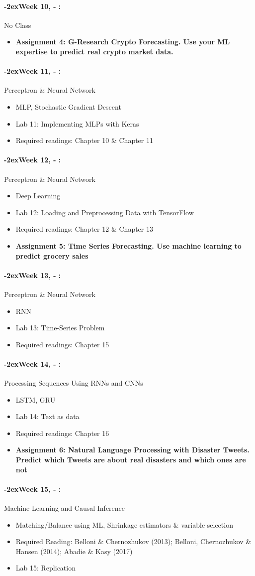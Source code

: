 \documentclass[11pt]{article}
\newcommand{\week}[1]{%
  \paragraph*{\kern-2ex\quad #1, \syldate{\today} - \AdvanceDate[4]\syldate{\today}:}%
  \ifdim\wd1=\wd\MONDAY
    \AdvanceDate[7]
  \else
    \AdvanceDate[7]
  \fi%
}
\begin{document}
\week{Week 10} No Class
\begin{itemize}
\item \textbf{Assignment 4: G-Research Crypto Forecasting. Use your ML expertise to predict real crypto market data.}
\end{itemize}

\week{Week 11} Perceptron {\&} Neural Network 
\begin{itemize}
\item MLP, Stochastic Gradient Descent
\item Lab 11: Implementing MLPs with Keras
\item Required readings: Chapter 10 {\&} Chapter 11

\end{itemize}

\week{Week 12} Perceptron {\&} Neural Network 
\begin{itemize}
\item Deep Learning
\item Lab 12: Loading and Preprocessing Data with TensorFlow 
\item Required readings: Chapter 12 {\&} Chapter 13
\item \textbf{Assignment 5: Time Series Forecasting. Use machine learning to predict grocery sales}
\end{itemize}

\week{Week 13} Perceptron {\&} Neural Network
\begin{itemize}
\item RNN
\item Lab 13: Time-Series Problem
\item Required readings: Chapter 15

\end{itemize}

\week{Week 14} Processing Sequences Using RNNs and CNNs
\begin{itemize}
\item LSTM, GRU
\item Lab 14: Text as data 
\item Required readings: Chapter 16
\item \textbf{Assignment 6: Natural Language Processing with Disaster Tweets. Predict which Tweets are about real disasters and which ones are not}
\end{itemize}

\week{Week 15} Machine Learning and Causal Inference 
\begin{itemize}
\item Matching/Balance using ML, Shrinkage estimators {\&} variable selection
\item Required Reading:  Belloni {\&} Chernozhukov (2013); Belloni, Chernozhukov {\&} Hansen (2014); Abadie {\&} Kasy (2017)
\item Lab 15: Replication
\end{itemize}
\end{document}
